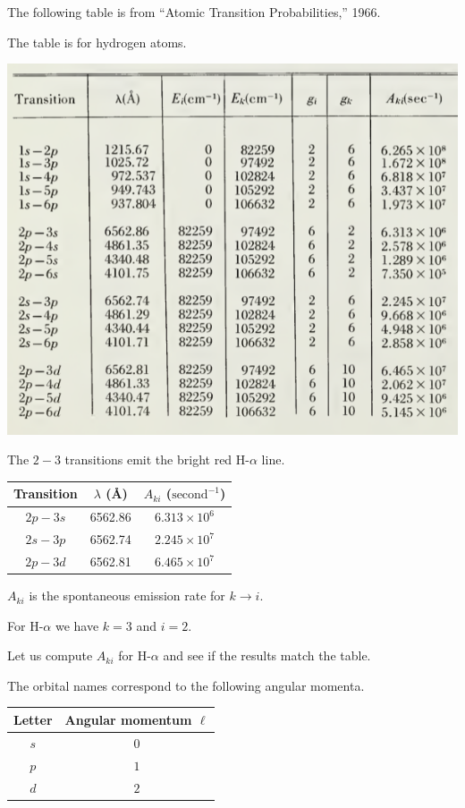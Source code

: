 \documentclass[12pt]{article}
\begin{document}
\noindent
The following table is from ``Atomic Transition Probabilities,'' 1966.

\bigskip
\noindent
The table is for hydrogen atoms.

\begin{center}
\includegraphics[scale=0.5]{h-alpha-line.png}
\end{center}

\noindent
The $2-3$ transitions emit the bright red H-$\alpha$ line.
\begin{center}
\begin{tabular}{|c|c|c|}
\hline
Transition & $\lambda$ (\AA) & $A_{ki}$ ($\text{second}^{-1}$)
\\
\hline
$2p-3s$ & 6562.86 & $6.313\times10^6$
\\
$2s-3p$ & 6562.74 & $2.245\times10^7$
\\
$2p-3d$ & 6562.81 & $6.465\times10^7$
\\
\hline
\end{tabular}
\end{center}

\noindent
$A_{ki}$ is the spontaneous emission rate for $k\rightarrow i$.

\bigskip
\noindent
For H-$\alpha$ we have $k=3$ and $i=2$.

\bigskip
\noindent
Let us compute $A_{ki}$ for H-$\alpha$ and see if the results match the table.

\bigskip
\noindent
The orbital names correspond to the following angular momenta.
\begin{center}
\begin{tabular}{|c|c|}
\hline
Letter & Angular momentum $\ell$
\\
\hline
$s$ & $0$
\\
$p$ & $1$
\\
$d$ & $2$
\\
\hline
\end{tabular}
\end{center}
\end{document}
